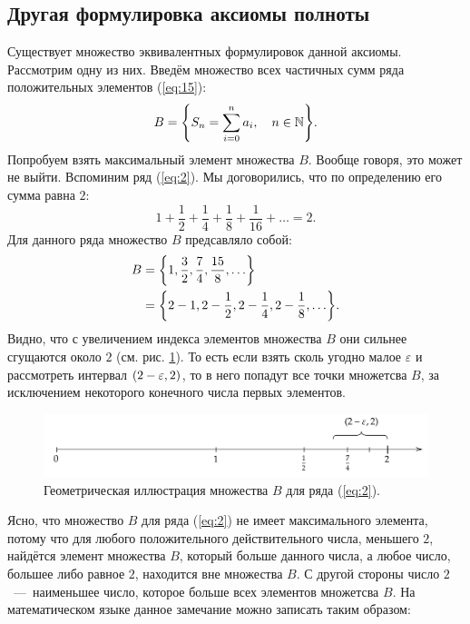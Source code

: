 \documentclass[12pt]{article}
\begin{document}
\subsection{Другая формулировка аксиомы полноты}
Существует множество эквивалентных формулировок данной аксиомы. Рассмотрим одну из них. Введём множество всех частичных сумм ряда положительных элементов (\ref{eq:15}):
\begin{equation}
    B = \qty{S_n = \sum_{i=0}^n a_i,\quad n\in \mathbb {N}}.
\end{equation}
Попробуем взять максимальный элемент множества $B$. Вообще говоря, это может не выйти. Вспоминим ряд (\ref{eq:2}). Мы договорились, что по определению его сумма равна $2$:
\begin{equation}
    1 + \dfrac{1}{2} + \dfrac14 + \dfrac18 + \dfrac{1}{16} + \ldots = 2.
\end{equation}
Для данного ряда множество $B$ предсавляло собой:
\begin{equation}
    \begin{split}
        B &= \qty{1,\dfrac{3}{2},\dfrac74,\dfrac{15}{8},\ldots}\\
        &=\qty{2-1,2-\dfrac{1}{2},2-\dfrac{1}{4},2-\dfrac{1}{8},\ldots}.
    \end{split}
\end{equation}
Видно, что с увеличением индекса элементов множества $B$ они сильнее сгущаются около $2$ (см. рис. \ref{fig:4}). То есть если взять сколь угодно малое $\varepsilon$ и рассмотреть интервал $\qty(2-\varepsilon,2)$, то в него попадут все точки множетсва $B$, за исключением некоторого конечного числа первых элементов.
\begin{figure}[ht]
    \centering
    \includegraphics[width = 1\textwidth]{Лекция 2/fig4.png}
    \caption{Геометрическая иллюстрация множества $B$ для ряда (\ref{eq:2}).}
    \label{fig:4}
\end{figure}
Ясно, что множество $B$ для ряда (\ref{eq:2}) не имеет максимального элемента, потому что для любого положительного действительного числа, меньшего $2$, найдётся элемент множества $B$, который больше данного числа, а любое число, большее либо равное $2$, находится вне множества $B$. С другой стороны число $2$~\----~наименьшее число, которое больше всех элементов множетсва $B$. На математическом языке данное замечание можно записать таким образом:
\end{document}

